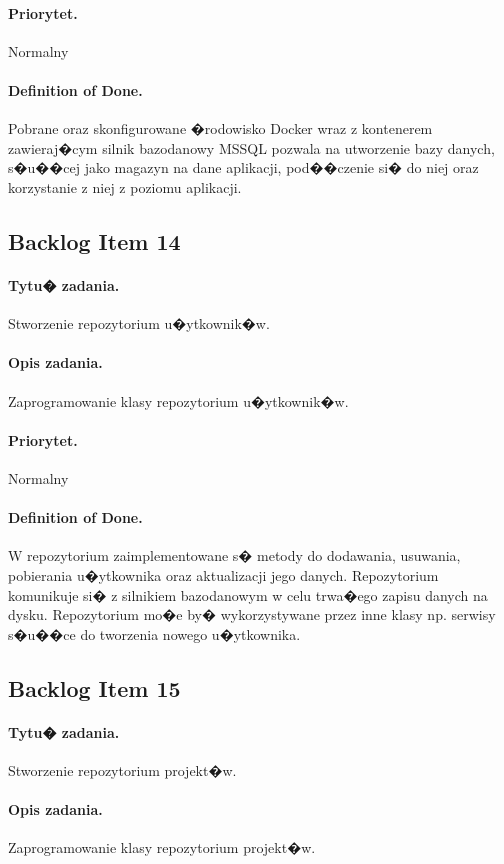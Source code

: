 ﻿\documentclass[a4paper]{article}
\begin{document}
\paragraph{Priorytet.} Normalny
\paragraph{Definition of Done.} Pobrane oraz skonfigurowane �rodowisko Docker wraz z kontenerem zawieraj�cym silnik bazodanowy MSSQL pozwala na utworzenie bazy danych, s�u��cej jako magazyn na dane aplikacji, pod��czenie si� do niej oraz korzystanie z niej z poziomu aplikacji.

\subsection{Backlog Item 14} 
\paragraph{Tytu� zadania.} Stworzenie repozytorium u�ytkownik�w.
\paragraph{Opis zadania.} Zaprogramowanie klasy repozytorium u�ytkownik�w.
\paragraph{Priorytet.} Normalny
\paragraph{Definition of Done.} W repozytorium zaimplementowane s� metody do dodawania, usuwania, pobierania u�ytkownika oraz aktualizacji jego danych. Repozytorium komunikuje si� z silnikiem bazodanowym w celu trwa�ego zapisu danych na dysku. Repozytorium mo�e by� wykorzystywane przez inne klasy np. serwisy s�u��ce do tworzenia nowego u�ytkownika.

\subsection{Backlog Item 15} 
\paragraph{Tytu� zadania.} Stworzenie repozytorium projekt�w.
\paragraph{Opis zadania.} Zaprogramowanie klasy repozytorium projekt�w.
\end{document}
